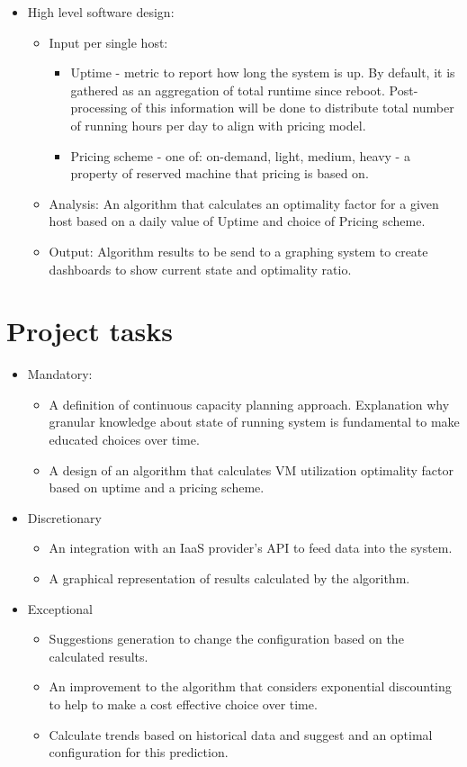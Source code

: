 \documentclass[11pt]{artikel3}
\begin{document}
\begin{itemize}
\item High level software design:
\begin{itemize}
\item Input per single host: 
	\begin{itemize}
	\item Uptime - metric to report how long the system is up. By default, it is gathered as an aggregation of total runtime since reboot. Post-processing of this information will be done to distribute total number of running hours per day to align with pricing model.
	\item Pricing scheme - one of: on-demand, light, medium, heavy - a property of reserved machine that pricing is based on.
	\end{itemize}
\item Analysis: An algorithm that calculates an optimality factor for a given host based on a daily value of Uptime and choice of Pricing scheme.
\item Output: Algorithm results to be send to a graphing system to create dashboards to show current state and optimality ratio.
\end{itemize}
\end{itemize}

\section{Project tasks}

\begin{itemize}
\item Mandatory:
\begin{itemize}
\item A definition of continuous capacity planning approach. Explanation why granular knowledge about state of running system is fundamental to make educated choices over time. 
\item A design of an algorithm that calculates VM utilization optimality factor based on uptime and a pricing scheme.
\end{itemize}

\item Discretionary
\begin{itemize}
\item An integration with an IaaS provider's API to feed data into the system.
\item A graphical representation of results calculated by the algorithm.
\end{itemize}

\item Exceptional
\begin{itemize}
\item Suggestions generation to change the configuration based on the calculated results.
\item An improvement to the algorithm that considers exponential discounting to help to make a cost effective choice over time.
\item Calculate trends based on historical data and suggest and an optimal configuration for this prediction.
\end{itemize}
\end{itemize}
\end{document}
